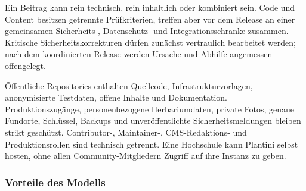 \documentclass[10pt,a4paper,oneside]{article}
\begin{document}
Ein Beitrag kann rein technisch, rein inhaltlich oder kombiniert sein. Code und Content besitzen getrennte Prüfkriterien, treffen aber vor dem Release an einer gemeinsamen Sicherheits-, Datenschutz- und Integrationsschranke zusammen. Kritische Sicherheitskorrekturen dürfen zunächst vertraulich bearbeitet werden; nach dem koordinierten Release werden Ursache und Abhilfe angemessen offengelegt.

\begin{decisionbox}[title={\textbf{Wichtig: offen entwickeln, geschützt betreiben}}]
Öffentliche Repositories enthalten Quellcode, Infrastrukturvorlagen, anonymisierte Testdaten, offene Inhalte und Dokumentation. Produktionszugänge, personenbezogene Herbariumdaten, private Fotos, genaue Fundorte, Schlüssel, Backups und unveröffentlichte Sicherheitsmeldungen bleiben strikt geschützt. Contributor-, Maintainer-, CMS-Redaktions- und Produktionsrollen sind technisch getrennt. Eine Hochschule kann Plantini selbst hosten, ohne allen Community-Mitgliedern Zugriff auf ihre Instanz zu geben.
\end{decisionbox}

\subsubsection{Vorteile des Modells}
\end{document}
